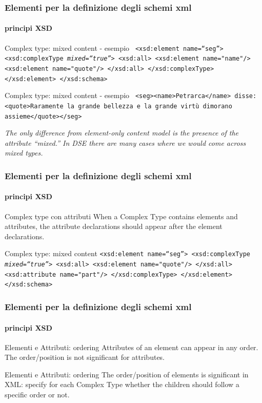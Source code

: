 \begin{frame}
	\frametitle{Elementi per la definizione degli schemi xml}
	\framesubtitle{principi XSD}
	\addtocounter{nframe}{1}

	\begin{block}{Complex type: mixed content - esempio}
		\texttt{
  <xsd:element name=``seg''>
    <xsd:complexType \textit{mixed=``true''}>
      <xsd:all>
        <xsd:element name="name"/>
        <xsd:element name="quote"/>
      </xsd:all>
    </xsd:complexType>
  </xsd:element>
</xsd:schema>
		}
	\end{block}

	\begin{block}{Complex type: mixed content - esempio}
		\texttt{
			<seg><name>Petrarca</name> disse: <quote>Raramente la grande bellezza e la grande virtù dimorano assieme</quote></seg>
		}
	\end{block}

	\textit{The only difference from element-only content model is the presence of the attribute ``mixed.'' In DSE there are many cases where we would come across mixed types.}
\end{frame}

\begin{frame}
	\frametitle{Elementi per la definizione degli schemi xml}
	\framesubtitle{principi XSD}
	\addtocounter{nframe}{1}

	\begin{block}{Complex type con attributi}
		When a Complex Type contains elements and attributes, the attribute declarations should appear after the element declarations.
	\end{block}

	\begin{block}{Complex type: mixed content}
		\texttt{<xsd:element name=``seg''>
		<xsd:complexType \textit{mixed=``true''}>
		  <xsd:all>
			<xsd:element name="quote"/>
		  </xsd:all>
		<xsd:attribute name="part"/>
		</xsd:complexType>
	  </xsd:element>
	</xsd:schema>}
	\end{block}
\end{frame}


\begin{frame}
	\frametitle{Elementi per la definizione degli schemi xml}
	\framesubtitle{principi XSD}
	\addtocounter{nframe}{1}

	\begin{block}{Elementi e Attributi: ordering}
		Attributes of an element can appear in any order. The order/position is not significant for attributes.
		
	\end{block}

	\begin{block}{Elementi e Attributi: ordering}
		The order/position of elements is significant in XML: specify for each Complex Type whether the children should follow a specific order or not.
	\end{block}
\end{frame}



